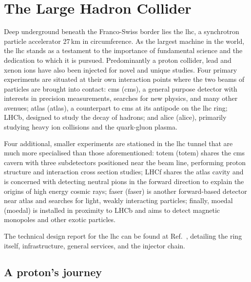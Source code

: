 

\section{The Large Hadron Collider}
\label{sec:detector_lhc}

Deep underground beneath the Franco-Swiss border lies the \acrfull{lhc}, a synchrotron particle accelerator 27\,km in circumference. As the largest machine in the world, the \acrshort{lhc} stands as a testament to the importance of fundamental science and the dedication to which it is pursued. Predominantly a proton collider, lead and xenon ions have also been injected for novel and unique studies. Four primary experiments are situated at their own interaction points where the two beams of particles are brought into contact: \acrshort{cms} (\acrlong{cms}), a general purpose detector with interests in precision measurements, searches for new physics, and many other avenues; \acrshort{atlas} (\acrlong{atlas}), a counterpart to \acrshort{cms} at its antipode on the \acrshort{lhc} ring; LHCb, designed to study the decay of \PB hadrons; and \acrshort{alice} (\acrlong{alice}), primarily studying heavy ion collisions and the quark-gluon plasma.

Four additional, smaller experiments are stationed in the \acrshort{lhc} tunnel that are much more specialised than those aforementioned: \acrshort{totem} (\acrlong{totem}) shares the \acrshort{cms} cavern with three subdetectors positioned near the beam line, performing proton structure and interaction cross section studies; LHCf shares the \acrshort{atlas} cavity and is concerned with detecting neutral pions in the forward direction to explain the origins of high energy cosmic rays; \acrshort{faser} (\acrlong{faser}) is another forward-based detector near \acrshort{atlas} and searches for light, weakly interacting particles; finally, \acrshort{moedal} (\acrlong{moedal}) is installed in proximity to LHCb and aims to detect magnetic monopoles and other exotic particles.

The technical design report for the \acrshort{lhc} can be found at Ref.~, detailing the ring itself, infrastructure, general services, and the injector chain.




\subsection{A proton's journey}  %
\label{subsec:protons_journey}

